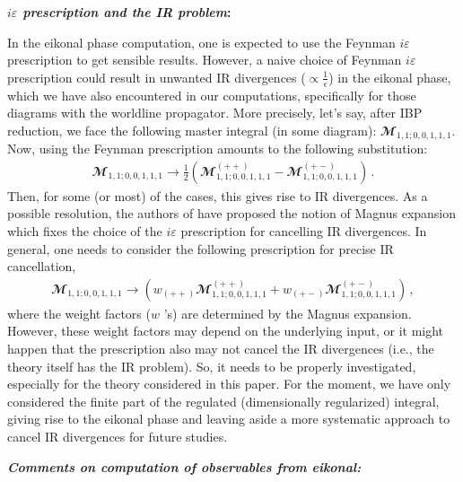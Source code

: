 \textbf{\textit{$i\varepsilon$ prescription and the IR problem}:}

In the eikonal phase computation, one is expected to use the Feynman $i\varepsilon$ prescription to get sensible results. However,  a naive choice of Feynman $i\varepsilon$ prescription could result in unwanted IR divergences ($\propto \frac{1}{\epsilon}$) in the eikonal phase, which we have also encountered in our computations, specifically for those diagrams with the worldline propagator. More precisely, let's say, after IBP reduction, we face the following master integral (in some diagram): $\mathbfcal{M}_{1,1;0,0,1,1,1}$. Now, using the Feynman prescription amounts to the following substitution:
\begin{align}
    \mathbfcal{M}_{1,1;0,0,1,1,1}\to \frac{1}{2}\left( \mathbfcal{M}_{1,1;0,0,1,1,1}^{(++)}-\mathbfcal{M}_{1,1;0,0,1,1,1}^{(+-)}\right)\,. \label{6.1k}
\end{align}
Then, for some (or most) of the cases, this gives rise to IR divergences. As a possible resolution, the authors of \cite{Kim:2024svw} have proposed the notion of Magnus expansion which fixes the choice of the $i\varepsilon$ prescription for cancelling IR divergences. In general, one needs to consider the following prescription for precise IR cancellation,
\begin{align}
    \mathbfcal{M}_{1,1;0,0,1,1,1}\to \left( w_{(++)}\mathbfcal{M}_{1,1;0,0,1,1,1}^{(++)}+w_{(+-)}\mathbfcal{M}_{1,1;0,0,1,1,1}^{(+-)}\right)\,, \label{6.2k}
\end{align}
where the weight factors ($w$ 's) are determined by the Magnus expansion. However, these weight factors may depend on the underlying input, or it might happen that the prescription also may not cancel the IR divergences (i.e., the theory itself has the IR problem). So, it needs to be properly investigated, especially for the theory considered in this paper. For the moment, we have only considered the finite part of the regulated (dimensionally regularized) integral, giving rise to the eikonal phase and leaving aside a more systematic approach to cancel IR divergences for future studies.

\textbf{\textit{Comments on computation of observables from eikonal:}}

